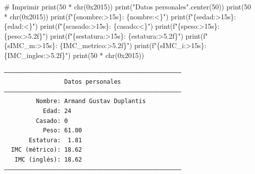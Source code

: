 \documentclass[
  spanish,
  letterpaper,
]{scrbook}
\newenvironment{Shaded}{\begin{snugshade}}{\end{snugshade}}
\newcommand{\BaseNTok}[1]{\textcolor[rgb]{0.68,0.00,0.00}{#1}}
\newcommand{\BuiltInTok}[1]{\textcolor[rgb]{0.00,0.23,0.31}{#1}}
\newcommand{\CommentTok}[1]{\textcolor[rgb]{0.37,0.37,0.37}{#1}}
\newcommand{\DecValTok}[1]{\textcolor[rgb]{0.68,0.00,0.00}{#1}}
\newcommand{\NormalTok}[1]{\textcolor[rgb]{0.00,0.23,0.31}{#1}}
\newcommand{\OperatorTok}[1]{\textcolor[rgb]{0.37,0.37,0.37}{#1}}
\newcommand{\SpecialCharTok}[1]{\textcolor[rgb]{0.37,0.37,0.37}{#1}}
\newcommand{\SpecialStringTok}[1]{\textcolor[rgb]{0.13,0.47,0.30}{#1}}
\newcommand{\StringTok}[1]{\textcolor[rgb]{0.13,0.47,0.30}{#1}}
\theoremstyle{definition}
\theoremstyle{remark}
\begin{document}
\begin{Shaded}
\begin{Highlighting}[]
\CommentTok{\# Imprimir}
\BuiltInTok{print}\NormalTok{(}\DecValTok{50} \OperatorTok{*} \BuiltInTok{chr}\NormalTok{(}\BaseNTok{0x2015}\NormalTok{))}
\BuiltInTok{print}\NormalTok{(}\StringTok{"Datos personales"}\NormalTok{.center(}\DecValTok{50}\NormalTok{))}
\BuiltInTok{print}\NormalTok{(}\DecValTok{50} \OperatorTok{*} \BuiltInTok{chr}\NormalTok{(}\BaseNTok{0x2015}\NormalTok{))}
\BuiltInTok{print}\NormalTok{(}\SpecialStringTok{f"}\SpecialCharTok{\{}\NormalTok{snombre}\SpecialCharTok{:\textgreater{}15s\}}\SpecialStringTok{: }\SpecialCharTok{\{}\NormalTok{nombre}\SpecialCharTok{:\textless{}\}}\SpecialStringTok{"}\NormalTok{)}
\BuiltInTok{print}\NormalTok{(}\SpecialStringTok{f"}\SpecialCharTok{\{}\NormalTok{sedad}\SpecialCharTok{:\textgreater{}15s\}}\SpecialStringTok{: }\SpecialCharTok{\{}\NormalTok{edad}\SpecialCharTok{:\textless{}\}}\SpecialStringTok{"}\NormalTok{)}
\BuiltInTok{print}\NormalTok{(}\SpecialStringTok{f"}\SpecialCharTok{\{}\NormalTok{scasado}\SpecialCharTok{:\textgreater{}15s\}}\SpecialStringTok{: }\SpecialCharTok{\{}\NormalTok{casado}\SpecialCharTok{:\textless{}\}}\SpecialStringTok{"}\NormalTok{)}
\BuiltInTok{print}\NormalTok{(}\SpecialStringTok{f"}\SpecialCharTok{\{}\NormalTok{speso}\SpecialCharTok{:\textgreater{}15s\}}\SpecialStringTok{: }\SpecialCharTok{\{}\NormalTok{peso}\SpecialCharTok{:\textgreater{}5.2f\}}\SpecialStringTok{"}\NormalTok{)}
\BuiltInTok{print}\NormalTok{(}\SpecialStringTok{f"}\SpecialCharTok{\{}\NormalTok{sestatura}\SpecialCharTok{:\textgreater{}15s\}}\SpecialStringTok{: }\SpecialCharTok{\{}\NormalTok{estatura}\SpecialCharTok{:\textgreater{}5.2f\}}\SpecialStringTok{"}\NormalTok{)}
\BuiltInTok{print}\NormalTok{(}\SpecialStringTok{f"}\SpecialCharTok{\{}\NormalTok{sIMC\_m}\SpecialCharTok{:\textgreater{}15s\}}\SpecialStringTok{: }\SpecialCharTok{\{}\NormalTok{IMC\_metrico}\SpecialCharTok{:\textgreater{}5.2f\}}\SpecialStringTok{"}\NormalTok{)}
\BuiltInTok{print}\NormalTok{(}\SpecialStringTok{f"}\SpecialCharTok{\{}\NormalTok{sIMC\_i}\SpecialCharTok{:\textgreater{}15s\}}\SpecialStringTok{: }\SpecialCharTok{\{}\NormalTok{IMC\_ingles}\SpecialCharTok{:\textgreater{}5.2f\}}\SpecialStringTok{"}\NormalTok{)}
\BuiltInTok{print}\NormalTok{(}\DecValTok{50} \OperatorTok{*} \BuiltInTok{chr}\NormalTok{(}\BaseNTok{0x2015}\NormalTok{))}
\end{Highlighting}
\end{Shaded}

\begin{verbatim}
――――――――――――――――――――――――――――――――――――――――――――――――――
                 Datos personales                 
――――――――――――――――――――――――――――――――――――――――――――――――――
         Nombre: Armand Gustav Duplantis
           Edad: 24
         Casado: 0
           Peso: 61.00
       Estatura:  1.81
  IMC (métrico): 18.62
   IMC (inglés): 18.62
――――――――――――――――――――――――――――――――――――――――――――――――――
\end{verbatim}
\end{document}
